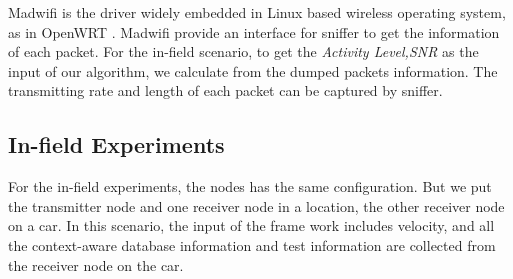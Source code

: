 Madwifi is the driver widely embedded in Linux based wireless operating system, as in OpenWRT \cite{Madwifi,Openwrt}. Madwifi provide an interface for sniffer to get the information of each packet.
For the in-field scenario,
to get the \emph{Activity Level,SNR} as the input of our algorithm, 
we calculate from the dumped packets information. The transmitting rate and length of each packet can be captured by sniffer.%




\subsection{In-field Experiments}

For the in-field experiments, the nodes has the same configuration. But we put the transmitter node and one receiver node in a location, the other receiver node on a car. In this scenario, the input of the frame work includes velocity, and all the context-aware database information and test information are collected from the receiver node on the car.

